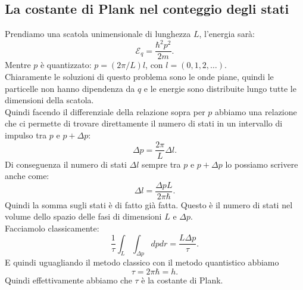 \subsection{La costante di Plank nel conteggio degli stati}%
Prendiamo una scatola unimensionale di lunghezza $L$, l'energia sarà:
\[
	\mathcal{E}_{q} = \frac{\hbar^2 p^2}{2m}
.\] 
Mentre $p$ è quantizzato: $p = \left( 2\pi /L  \right) l$, con $l = \left( 0,1,2,\ldots \right)$. \\
Chiaramente le soluzioni di questo problema sono le onde piane, quindi le particelle non hanno dipendenza da $q$ e le energie sono distribuite lungo tutte le dimensioni della scatola.\\
Quindi facendo il differenziale della relazione sopra per $p$ abbiamo una relazione che ci permette di trovare direttamente il numero di stati in un intervallo di impulso tra $p$ e  $p + \Delta p$:
\[
	\Delta p = \frac{2\pi}{L}\Delta l
.\] 
Di conseguenza il numero di stati $\Delta l$ sempre tra $p$ e $p + \Delta p$ lo possiamo scrivere anche come:
\[
	\Delta l = \frac{\Delta pL}{2\pi \hbar}
.\]
Quindi la somma sugli stati è di fatto già fatta. Questo è il numero di stati nel volume dello spazio delle fasi di dimensioni $L$ e $\Delta p$.\\
Facciamolo classicamente:
\[
	\frac{1}{\tau} \int_{L}\int_{\Delta p} dp dr = \frac{L \Delta p}{\tau}
.\]  
E quindi uguagliando il metodo classico con il metodo quantistico abbiamo 
\[
	\tau = 2\pi\hbar = h
.\]
Quindi effettivamente abbiamo che  $\tau$ è la costante di Plank. \\


